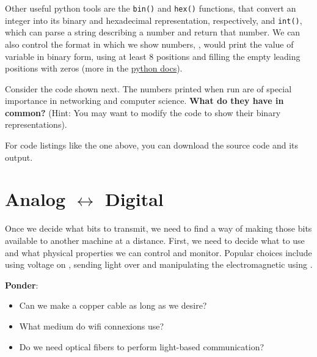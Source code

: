 Other useful python tools are the \texttt{bin()} and \texttt{hex()} functions, that convert an integer 
into its binary and hexadecimal representation, respectively, and \texttt{int()}, which can parse
a string describing a number and return that number. We can also control the format in which we show numbers,
\eg,  would print the value of variable  in binary form, 
using at least 8 positions and filling the empty leading positions with zeros
(more in the \href{https://docs.python.org/3/reference/lexical_analysis.html#f-strings}{python docs}).

\begin{exercise}
Consider the code shown next. The numbers printed when run are of special importance in networking and computer science.
\textbf{What do they have in common?} (Hint: You may want to modify the code to show their binary representations).
\label{ex:bitwisemanipulation}
\end{exercise}
\begin{center}
\end{center}
\begin{remark}
For code listings like the one above, you can download the source code and its output.
\end{remark}


\section{Analog $\leftrightarrow$ Digital}\label{sec:piercing:analog_digital}

Once we decide what bits to transmit, we need to find a way of making those bits available to another machine at a distance.
First, we need to decide what  to use and what physical properties we can control and monitor.
Popular choices include using voltage on , sending light over  and manipulating the 
electromagnetic  using .

\begin{exercise} \textbf{Ponder}:\\[-0.5cm]
\begin{itemize}
\item Can we make a copper cable as long as we desire?
\item What medium do wifi connexions use? 
\item Do we need optical fibers to perform light-based communication?
\end{itemize}
\end{exercise}


